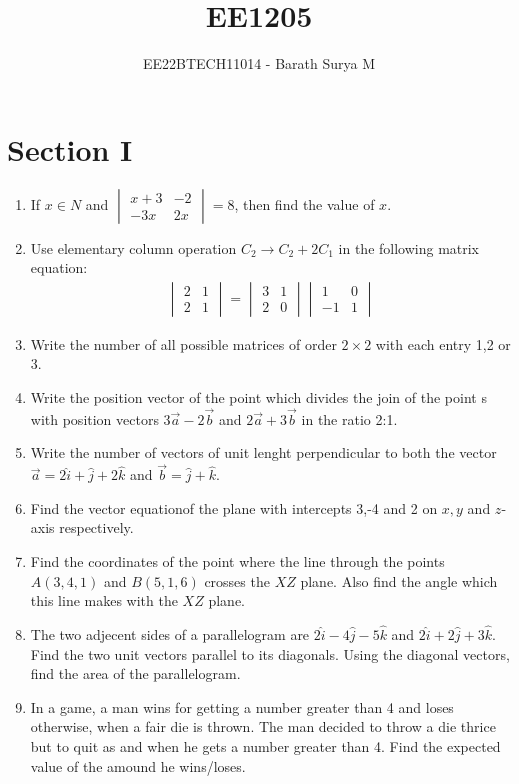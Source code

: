 \documentclass[journal,12pt,onecolumn]{IEEEtran}
\theoremstyle{remark}
\providecommand{\brak}[1]{\ensuremath{\left(#1\right)}}
\newcommand{\mydet}[1]{\ensuremath{\begin{vmatrix}#1\end{vmatrix}}}
\begin{document}

\vspace{3cm}

\title{EE1205}
\author{EE22BTECH11014 - Barath Surya M}
\maketitle
\section*{Section I}
\begin{enumerate}
    \item If $x \in N$ and $\mydet{x+3 & -2 \\ -3x & 2x} = 8$, then find the value of $x$.
    \item Use elementary column operation $C_2 \rightarrow C_2 + 2C_1$ in the following matrix equation:
          \begin{align*}
              \mydet{2 & 1 \\2&1} = \mydet{3&1 \\ 2&0} \mydet{1 & 0\\ -1 & 1}
          \end{align*}
    \item Write the number of all possible matrices of order $2\times2$ with each entry 1,2 or 3.
    \item Write the position vector of the point which divides the join of the point s with position vectors $3\vec{a} - 2\vec{b}$ and $2\vec{a} + 3\vec{b}$ in the ratio 2:1.
    \item Write the number of vectors of unit lenght perpendicular to both the vector $\vec{a} = 2 \hat{i} + \hat{j} +2\hat{k}$ and $\vec{b}= \hat{j}+\hat{k}$.
    \item Find the vector equationof the plane with intercepts 3,-4 and 2 on $x,y$ and  $z$-axis respectively.
    \item Find the coordinates of the point where the line through the points $A\brak{3,4,1}$ and $B\brak{5,1,6}$ crosses the $XZ$ plane. Also find the angle which this line makes with the $XZ$ plane.
    \item The two adjecent sides of a parallelogram are $2\hat{i}-4\hat{j}-5\hat{k}$ and $2\hat{i}+2\hat{j}+3\hat{k}$. Find the two unit vectors parallel to its diagonals. Using the diagonal vectors, find the area of the parallelogram.
    \item In a game, a man wins  for getting a number greater than 4 and loses  otherwise, when a fair die is thrown. The man decided to throw a die thrice but to quit as and when he gets a number greater than 4. Find the expected value of the amound he wins/loses.

\end{enumerate}
\end{document}
